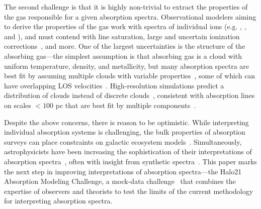 \documentclass[fleqn,usenatbib]{mnras}
\begin{document}
The second challenge is that it is highly non-trivial to extract the properties of the gas responsible for a given absorption spectra.
Observational modelers aiming to derive the properties of the gas work with spectra of individual ions (e.g. , , and ), and must contend with line saturation, large and uncertain ionization corrections~\citep[e.g.][]{Schaye2006, Acharya2021}, and more.
One of the largest uncertainties is the structure of the absorbing gas---the simplest assumption is that absorbing gas is a cloud with uniform temperature, density, and metallicity, but many absorption spectra are best fit by assuming multiple clouds with variable properties~\citep[e.g.][]{Boksenberg1979, Muzahid2015, Liang2017, Liang2018, Haislmaier2021, sameer2021.cloudbycloud.bayesian.absorption.system.modeling, zahedy2021.CUBS.III.zle1.LLSs, marra2021.cosmo.sims.test.observational.modeling, narayanan2021.a.multiphase.pLLS, nielsen2022.a.multiphase.DLA}, some of which can have overlapping LOS velocities~\citep[e.g.][]{Marra2022}.
High-resolution simulations predict a distribution of clouds instead of discrete clouds~\citep[e.g.][]{Fielding2020, Vijayan2021}, consistent with absorption lines on scales $<100$ pc that are best fit by multiple components~\citep[e.g.][]{Welsh2010}.

Despite the above concerns, there is reason to be optimistic.
While interpreting individual absorption systems is challenging, the bulk properties of absorption surveys can place constraints on galactic ecosystem models~\citep[e.g.][]{Sorini2018, Lan2018}.
Simultaneously, astrophysicists have been increasing the sophistication of their interpretations of absorption spectra~\citep[e.g.][]{Churchill2015, Sameer2021}, often with insight from synthetic spectra~\citep[e.g.][]{Hummels2013, Liang2018}.
This paper marks the next step in improving interpretations of absorption spectra---the Halo21 Absorption Modeling Challenge, a mock-data challenge~\citep[e.g.][]{Regimbau2012, Meacher2015, Hazboun2019} that combines the expertise of observers and theorists to test the limits of the current methodology for interpreting absorption spectra.
\end{document}
